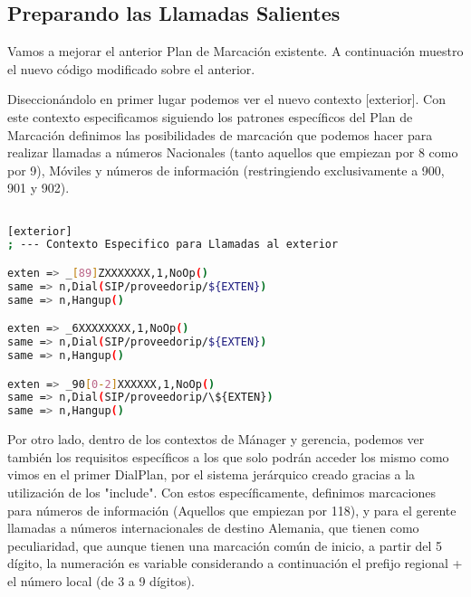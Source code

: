 \newpage

\color[rgb]{0,0,0}

\subsection{Preparando las Llamadas Salientes}

Vamos a mejorar el anterior Plan de Marcación existente. A continuación muestro el nuevo código modificado sobre el anterior.

Diseccionándolo en primer lugar podemos ver el nuevo contexto [exterior]. Con este contexto especificamos siguiendo los patrones específicos del Plan de Marcación definimos las posibilidades de marcación que podemos hacer para realizar llamadas a números Nacionales (tanto aquellos que empiezan por 8 como por 9), Móviles y números de información (restringiendo exclusivamente a 900, 901 y 902). 

\begin{lstlisting}[language=bash,title={/etc/asterisk/extensions.conf}]

[exterior]
; --- Contexto Especifico para Llamadas al exterior

exten => _[89]ZXXXXXXX,1,NoOp()
same => n,Dial(SIP/proveedorip/${EXTEN})
same => n,Hangup()

exten => _6XXXXXXXX,1,NoOp()
same => n,Dial(SIP/proveedorip/${EXTEN})
same => n,Hangup()

exten => _90[0-2]XXXXXX,1,NoOp()
same => n,Dial(SIP/proveedorip/\${EXTEN})
same => n,Hangup()

\end{lstlisting}

Por otro lado, dentro de los contextos de Mánager y gerencia, podemos ver también los requisitos específicos a los que solo podrán acceder los mismo como vimos en el primer DialPlan, por el sistema jerárquico creado gracias a la utilización de los "include". Con estos específicamente, definimos marcaciones para números de información (Aquellos que empiezan por 118), y para el gerente llamadas a números internacionales de destino Alemania, que tienen como peculiaridad, que aunque tienen una marcación común de inicio, a partir del 5 dígito, la numeración es variable considerando a continuación el prefijo regional + el número local (de 3 a 9 dígitos).

